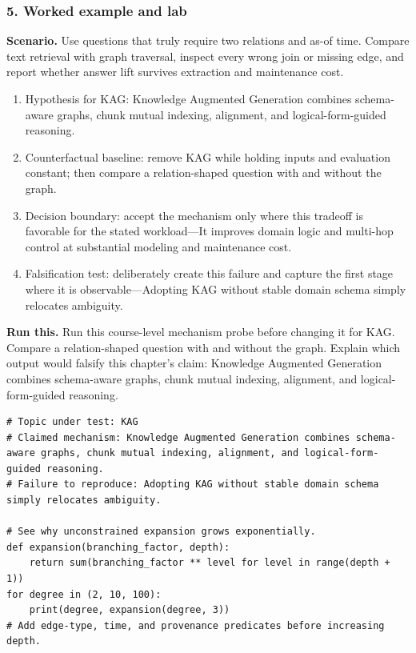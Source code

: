 \subsubsection*{5. Worked example and lab}
\textbf{Scenario.} Use questions that truly require two relations and as-of time. Compare text retrieval with graph traversal, inspect every wrong join or missing edge, and report whether answer lift survives extraction and maintenance cost.
\begin{enumerate}
\item Hypothesis for KAG: Knowledge Augmented Generation combines schema-aware graphs, chunk mutual indexing, alignment, and logical-form-guided reasoning.
\item Counterfactual baseline: remove KAG while holding inputs and evaluation constant; then compare a relation-shaped question with and without the graph.
\item Decision boundary: accept the mechanism only where this tradeoff is favorable for the stated workload—It improves domain logic and multi-hop control at substantial modeling and maintenance cost.
\item Falsification test: deliberately create this failure and capture the first stage where it is observable—Adopting KAG without stable domain schema simply relocates ambiguity.
\end{enumerate}
\textbf{Run this.} Run this course-level mechanism probe before changing it for KAG. Compare a relation-shaped question with and without the graph. Explain which output would falsify this chapter's claim: Knowledge Augmented Generation combines schema-aware graphs, chunk mutual indexing, alignment, and logical-form-guided reasoning.
\begin{Verbatim}[fontsize=\scriptsize]
# Topic under test: KAG
# Claimed mechanism: Knowledge Augmented Generation combines schema-aware graphs, chunk mutual indexing, alignment, and logical-form-guided reasoning.
# Failure to reproduce: Adopting KAG without stable domain schema simply relocates ambiguity.

# See why unconstrained expansion grows exponentially.
def expansion(branching_factor, depth):
    return sum(branching_factor ** level for level in range(depth + 1))
for degree in (2, 10, 100):
    print(degree, expansion(degree, 3))
# Add edge-type, time, and provenance predicates before increasing depth.
\end{Verbatim}
